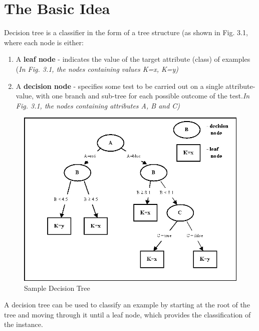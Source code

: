 \documentclass[12pt]{report}
\begin{document}
\section{The Basic Idea}

Decision tree is a classifier in the form of a tree structure (as shown in Fig. 3.1, where each node is either:
\begin{enumerate}
\item{A \textbf{leaf node} - indicates the value of the target attribute (class) of examples} (\textit{In Fig. 3.1, the nodes containing values K=x, K=y)}
\item{A \textbf{decision node} - specifies some test to be carried out on a single attribute-value, with one branch and sub-tree for each possible outcome of the test.\textit{In Fig. 3.1, the nodes containing attributes A, B and C)}}

\end{enumerate}

\begin{figure}[h!]
	\centering
		\includegraphics[scale=1.0]{dtreeexample.jpg}
	\caption{Sample Decision Tree}
	\label{fig:logo2}
\end{figure}

A decision tree can be used to classify an example by starting at the root of the tree and moving through it until a leaf node, which provides the classification of the instance.\\
\end{document}
